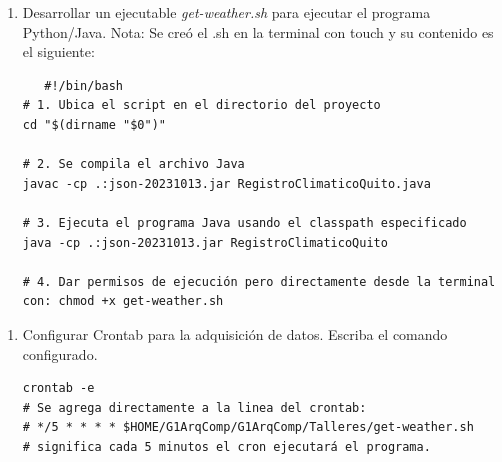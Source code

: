 \documentclass{article}
\begin{document}
\begin{enumerate}
\item Desarrollar un ejecutable \emph{get-weather.sh} para ejecutar el
programa Python/Java.
Nota: Se creó el .sh en la terminal con touch y su
contenido es el siguiente:

\begin{verbatim}
   #!/bin/bash
# 1. Ubica el script en el directorio del proyecto
cd "$(dirname "$0")"

# 2. Se compila el archivo Java
javac -cp .:json-20231013.jar RegistroClimaticoQuito.java

# 3. Ejecuta el programa Java usando el classpath especificado
java -cp .:json-20231013.jar RegistroClimaticoQuito

# 4. Dar permisos de ejecución pero directamente desde la terminal con: chmod +x get-weather.sh
\end{verbatim}
\end{enumerate}


\begin{enumerate}
\item Configurar Crontab para la adquisición de datos. Escriba el comando
configurado.

\begin{verbatim}
crontab -e
# Se agrega directamente a la linea del crontab:
# */5 * * * * $HOME/G1ArqComp/G1ArqComp/Talleres/get-weather.sh
# significa cada 5 minutos el cron ejecutará el programa.
\end{verbatim}
\end{enumerate}
\end{document}
